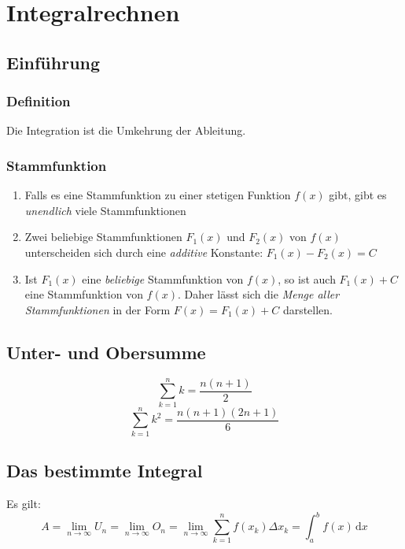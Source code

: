 \chapter{Integralrechnen}

\section{Einführung} %
\label{sec:einführung}

\subsection{Definition} %
\label{sub:definition}
Die Integration ist die Umkehrung der Ableitung.
\subsection{Stammfunktion} %
\begin{enumerate}
	\item Falls es eine Stammfunktion zu einer stetigen Funktion \(f(x)\) gibt, gibt es \emph{unendlich} viele Stammfunktionen
	\item Zwei beliebige Stammfunktionen \(F_1 (x)\) und \(F_2 (x)\) von \(f(x)\) unterscheiden sich durch eine \emph{additive} Konstante: \(F_1 (x) - F_2 (x) = C\)
	\item Ist \(F_1 (x)\) eine \emph{beliebige} Stammfunktion von \(f (x)\), so ist auch \(F_1 (x) + C\) eine Stammfunktion von \(f (x)\). Daher lässt sich die \emph{Menge aller Stammfunktionen} in der Form \(F(x) = F_1 (x) + C \) darstellen.
\end{enumerate}

\section{Unter- und Obersumme}
\[ \sum_{k=1}^{n} k = \frac{n(n+1)}{2} \]
\[ \sum_{k=1}^{n} k^2 = \frac{n(n+1)(2n+1)}{6} \]

\section{Das bestimmte Integral} %
\label{sub:das_bestimmte_integral}
Es gilt:\newline
\[A = \lim\limits_{n \rightarrow \infty}U_n = \lim\limits_{n \rightarrow \infty}O_n = \lim\limits_{n \rightarrow \infty}\sum_{k=1}^{n} f(x_k) \Delta x_k = \int_a^b f(x)\,\mathrm{d}x \]

